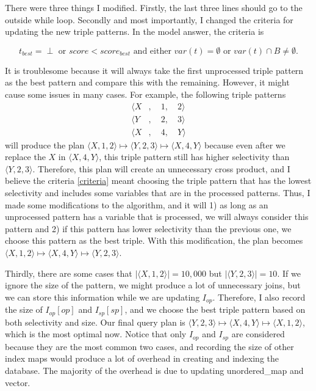 \documentclass{article}
\begin{document}
\begin{enumerate}
\begin{enumerate}
There were three things I modified. Firstly, the last three lines should go to the outside while loop. Secondly and most importantly, I changed the criteria for updating the new triple patterns. In the model answer, the criteria is 

\begin{equation}\label{criteria}
	t_{best} = \perp \text{ or } score < score_{best} \text{ and either } var(t) = \emptyset \text{ or } var(t) \cap B \neq \emptyset.
\end{equation}

It is troublesome because it will always take the first unprocessed triple pattern as the best pattern and compare this with the remaining. However, it might cause some issues in many cases. For example, the following triple patterns 
\begin{align*}
	\langle X &,\quad 1,\quad 2\rangle \\
	\langle Y &,\quad 2,\quad 3\rangle\\
	\langle X &,\quad 4,\quad Y\rangle
\end{align*}
will produce the plan $\langle X, 1, 2\rangle \mapsto \langle Y, 2, 3\rangle \mapsto \langle X, 4, Y\rangle$ because even after we replace the $X$ in $\langle X, 4, Y\rangle$, this triple pattern still has higher selectivity than $\langle Y, 2, 3\rangle$. Therefore, this plan will create an unnecessary cross product, and I believe the criteria \eqref{criteria} meant choosing the triple pattern that has the lowest selectivity and includes some variables that are in the processed patterns. Thus, I made some modifications to the algorithm, and it will 1) as long as an unprocessed pattern has a variable that is processed, we will always consider this pattern and 2) if this pattern has lower selectivity than the previous one, we choose this pattern as the best triple. With this modification, the plan becomes $\langle X, 1, 2\rangle \mapsto \langle X, 4, Y\rangle \mapsto \langle Y, 2, 3\rangle$. 

Thirdly, there are some cases that $|\langle X, 1, 2\rangle| = 10,000$ but $|\langle Y, 2, 3\rangle| = 10$. If we ignore the size of the pattern, we might produce a lot of unnecessary joins, but we can store this information while we are updating $I_{op}$. Therefore, I also record the size of $I_{op}[op]$ and $I_{sp}[sp]$, and we choose the best triple pattern based on both selectivity and size. Our final query plan is $\langle Y, 2, 3\rangle \mapsto \langle X, 4, Y\rangle \mapsto \langle X, 1, 2\rangle$, which is the most optimal now. Notice that only $I_{op}$ and $I_{sp}$ are considered because they are the most common two cases, and recording the size of other index maps would produce a lot of overhead in creating and indexing the database. The majority of the overhead is due to updating unordered\_map and vector. 


\end{enumerate}
\end{enumerate}
\end{document}
